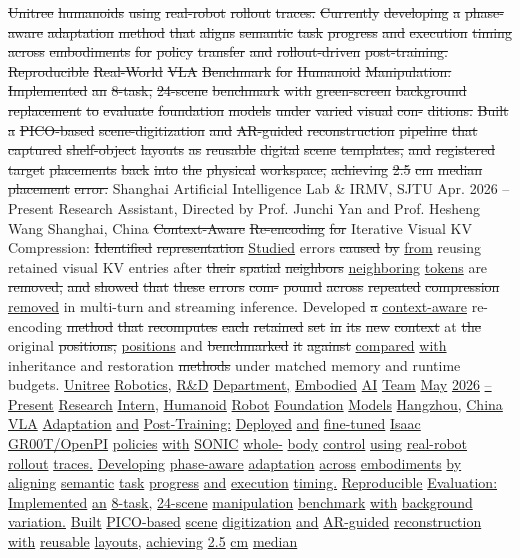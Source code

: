 \documentclass[10pt,letterpaper]{article}
\newcommand{\del}[1]{{\color{red}\sout{#1}}}
\newcommand{\add}[1]{{\color{blue}\uline{#1}}}
\begin{document}
\del{Unitree} \del{humanoids} \del{using} \del{real-robot} \del{rollout} \del{traces.} \del{Currently} \del{developing} \del{a} \del{phase-aware} \del{adaptation} \del{method} \del{that} \del{aligns} \del{semantic} \del{task} \del{progress} \del{and} \del{execution} \del{timing} \del{across} \del{embodiments} \del{for} \del{policy} \del{transfer} \del{and} \del{rollout-driven} \del{post-training.} \del{} \del{Reproducible} \del{Real-World} \del{VLA} \del{Benchmark} \del{for} \del{Humanoid} \del{Manipulation:} \del{Implemented} \del{an} \del{8-task,} \del{24-scene} \del{benchmark} \del{with} \del{green-screen} \del{background} \del{replacement} \del{to} \del{evaluate} \del{foundation} \del{models} \del{under} \del{varied} \del{visual} \del{con-} \del{ditions.} \del{Built} \del{a} \del{PICO-based} \del{scene-digitization} \del{and} \del{AR-guided} \del{reconstruction} \del{pipeline} \del{that} \del{captured} \del{shelf-object} \del{layouts} \del{as} \del{reusable} \del{digital} \del{scene} \del{templates,} \del{and} \del{registered} \del{target} \del{placements} \del{back} \del{into} \del{the} \del{physical} \del{workspace,} \del{achieving} \del{2.5} \del{cm} \del{median} \del{placement} \del{error.} Shanghai Artificial Intelligence Lab \& IRMV, SJTU Apr. 2026 -- Present Research Assistant, Directed by Prof. Junchi Yan and Prof. Hesheng Wang Shanghai, China  \del{Context-Aware} \del{Re-encoding} \del{for} Iterative Visual KV Compression: \del{Identified} \del{representation} \add{Studied} errors \del{caused} \del{by} \add{from} reusing retained visual KV entries after \del{their} \del{spatial} \del{neighbors} \add{neighboring} \add{tokens} are \del{removed,} \del{and} \del{showed} \del{that} \del{these} \del{errors} \del{com-} \del{pound} \del{across} \del{repeated} \del{compression} \add{removed} in multi-turn and streaming inference. Developed \del{a} \add{context-aware} re-encoding \del{method} \del{that} \del{recomputes} \del{each} \del{retained} \del{set} \del{in} \del{its} \del{new} \del{context} at \del{the} original \del{positions,} \add{positions} and \del{benchmarked} \del{it} \del{against} \add{compared} \add{with} inheritance and restoration \del{methods} under matched memory and runtime budgets. \add{Unitree} \add{Robotics,} \add{R\&D} \add{Department,} \add{Embodied} \add{AI} \add{Team} \add{May} \add{2026} \add{--} \add{Present} \add{Research} \add{Intern,} \add{Humanoid} \add{Robot} \add{Foundation} \add{Models} \add{Hangzhou,} \add{China} \add{} \add{VLA} \add{Adaptation} \add{and} \add{Post-Training:} \add{Deployed} \add{and} \add{fine-tuned} \add{Isaac} \add{GR00T/OpenPI} \add{policies} \add{with} \add{SONIC} \add{whole-} \add{body} \add{control} \add{using} \add{real-robot} \add{rollout} \add{traces.} \add{Developing} \add{phase-aware} \add{adaptation} \add{across} \add{embodiments} \add{by} \add{aligning} \add{semantic} \add{task} \add{progress} \add{and} \add{execution} \add{timing.} \add{} \add{Reproducible} \add{Evaluation:} \add{Implemented} \add{an} \add{8-task,} \add{24-scene} \add{manipulation} \add{benchmark} \add{with} \add{background} \add{variation.} \add{Built} \add{PICO-based} \add{scene} \add{digitization} \add{and} \add{AR-guided} \add{reconstruction} \add{with} \add{reusable} \add{layouts,} \add{achieving} \add{2.5} \add{cm} \add{median} 
\end{document}
